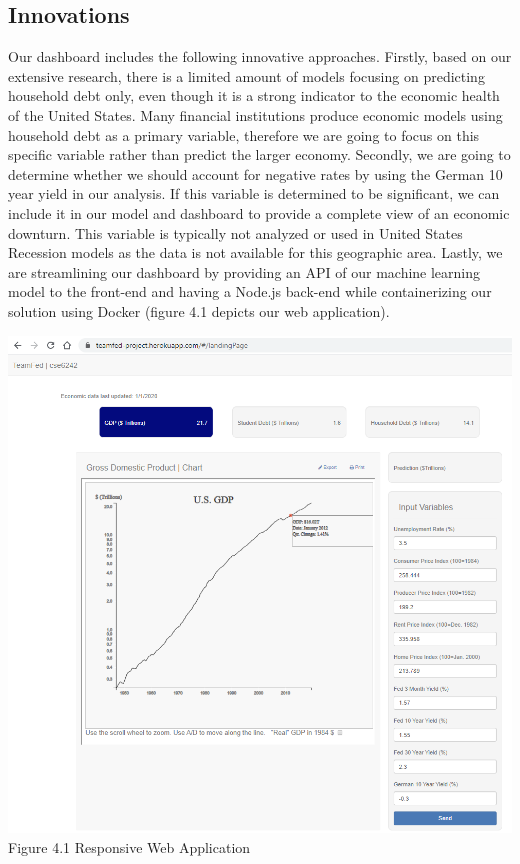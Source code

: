 \documentclass[sigconf,nonacm,11pt]{acmart}
\begin{document}


\vspace{-0.5em}


\subsection{Innovations}

Our dashboard includes the following innovative approaches. Firstly, based on our extensive research, there is a limited amount of models focusing on predicting household debt only, even though it is a strong indicator to the economic health of the United States. Many financial institutions produce economic models using household debt as a primary variable, therefore we are going to focus on this specific variable rather than predict the larger economy. Secondly, we are going to determine whether we should account for negative rates by using the German 10 year yield in our analysis. If this variable is determined to be significant, we can include it in our model and dashboard to provide a complete view of an economic downturn. This variable is typically not analyzed or used in United States Recession models as the data is not available for this geographic area.  Lastly, we are streamlining our dashboard by providing an API of our machine learning model to the front-end and having a Node.js back-end while containerizing our solution using Docker (figure 4.1 depicts our web application).\vspace{0.5em}


\includegraphics[scale = 0.32]{dashboard.png}
Figure 4.1 Responsive Web Application
\vspace{0.5em}
\end{document}
